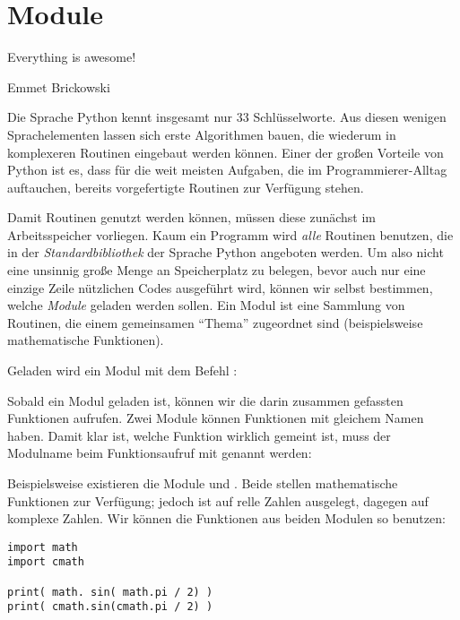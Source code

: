 \chapter{Module}
\epigraph{
	Everything is awesome!
}{Emmet Brickowski}

Die Sprache Python kennt insgesamt nur 33 Schlüsselworte. Aus diesen wenigen Sprachelementen lassen sich erste Algorithmen bauen, die wiederum in komplexeren Routinen eingebaut werden können. Einer der großen Vorteile von Python ist es, dass für die weit meisten Aufgaben, die im Programmierer-Alltag auftauchen, bereits vorgefertigte Routinen zur Verfügung stehen.

Damit Routinen genutzt werden können, müssen diese zunächst im Arbeitsspeicher vorliegen. Kaum ein Programm wird \emph{alle} Routinen benutzen, die in der \emph{Standardbibliothek} der Sprache Python angeboten werden. Um also nicht eine unsinnig große Menge an Speicherplatz zu belegen, bevor auch nur eine einzige Zeile nützlichen Codes ausgeführt wird, können wir selbst bestimmen, welche \emph{Module} geladen werden sollen. Ein Modul ist eine Sammlung von Routinen, die einem gemeinsamen \enquote{Thema} zugeordnet sind (beispielsweise mathematische Funktionen).

Geladen wird ein Modul mit dem Befehl :
\begin{codebox}[Syntax]
\end{codebox}

Sobald ein Modul geladen ist, können wir die darin zusammen gefassten Funktionen aufrufen. Zwei Module können Funktionen mit gleichem Namen haben. Damit klar ist, welche Funktion wirklich gemeint ist, muss der Modulname beim Funktionsaufruf mit genannt werden:

\begin{codebox}[Syntax]
\end{codebox}

Beispielsweise existieren die Module  und . Beide stellen mathematische Funktionen zur Verfügung; jedoch ist  auf relle Zahlen ausgelegt,  dagegen auf komplexe Zahlen. Wir können die Funktionen aus beiden Modulen so benutzen:

\begin{codebox}
\begin{verbatim}
import math
import cmath

print( math. sin( math.pi / 2) )
print( cmath.sin(cmath.pi / 2) )
\end{verbatim}
\end{codebox}


